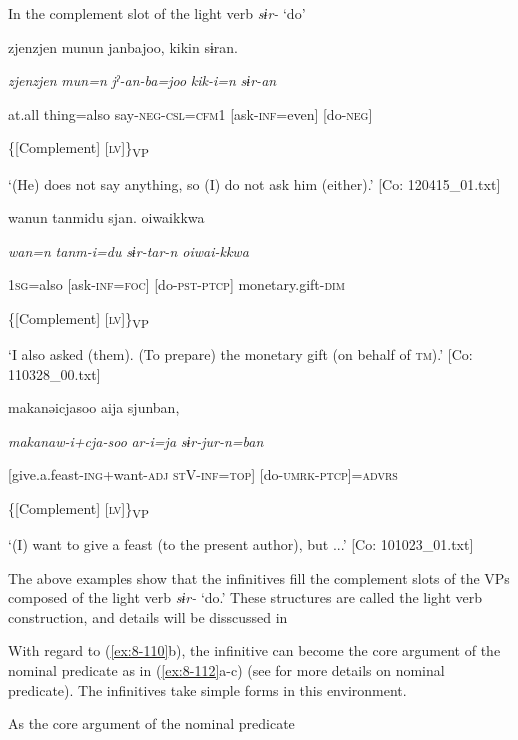 \ea\label{ex:8-111}
  In the complement slot of the light verb \textit{sɨr-} ‘do’

\ea {\TM}
\glll  zjenzjen  munun  janbajoo,  kikin  sɨran.

      \textit{zjenzjen}  \textit{mun=n}  \textit{jˀ-an-ba=joo}  \textit{kik-i=n}  \textit{sɨr{}-an}

      at.all  thing=also  say-\textsc{neg}-\textsc{csl}=\textsc{cfm1}  [ask-\textsc{inf}=even]  [do-\textsc{neg}]

            \{[Complement]  [\textsc{lv}]\}\textsubscript{VP}

\glt ‘(He) does not say anything, so (I) do not ask him (either).’ [Co: 120415\_01.txt]
\z

\ex  {\TM}
\glll  wanun  tanmidu  sjan.  {\textbar}oiwai{\textbar}kkwa

      \textit{wan=n}  \textit{tanm-i=du}  \textit{sɨr{}-tar-n  oiwai-kkwa}

      1\textsc{sg}=also  [ask-\textsc{inf}=\textsc{foc}]  [do-\textsc{pst}-\textsc{ptcp}]  monetary.gift-\textsc{dim}

        \{[Complement]  [\textsc{lv}]\}\textsubscript{VP}

\glt ‘I also asked (them). (To prepare) the monetary gift (on behalf of \textsc{tm}).’ [Co: 110328\_00.txt]
\z

\ex  {\TM}
\glll  makanəicjasoo  aija  sjunban,

      \textit{makanaw-i+cja-soo}  \textit{ar-i=ja}  \textit{sɨr{}-jur-n=ban}

      [give.a.feast-\textsc{ing}+want-\textsc{adj}  \textsc{st}V-\textsc{inf}=\textsc{top}]  [do-\textsc{umrk}-\textsc{ptcp}]=\textsc{advrs}

      \{[Complement]    [\textsc{lv}]\}\textsubscript{VP}

\glt ‘(I) want to give a feast (to the present author), but ...’ [Co: 101023\_01.txt]
\z

The above examples show that the infinitives fill the complement slots of the VPs composed of the light verb \textit{sɨr-} ‘do.’ These structures are called the light verb construction, and details will be disscussed in 

  With regard to (\ref{ex:8-110}b), the infinitive can become the core argument of the nominal predicate as in (\ref{ex:8-112}a-c) (see  for more details on nominal predicate). The infinitives take simple forms in this environment.

\ea\label{ex:8-112}
  As the core argument of the nominal predicate

